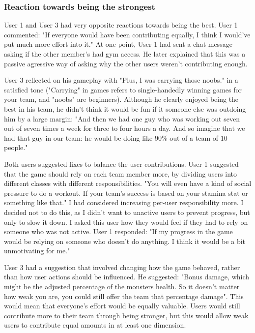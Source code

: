 \documentclass{l4proj}
\begin{document}
\subsubsection{Reaction towards being the strongest}

User 1 and User 3 had very opposite reactions towards being the best. User 1 commented: "If everyone would have been contributing equally, I think I would've put much more effort into it." At one point, User 1 had sent a chat message asking if the other member's had gym access. He later explained that this was a passive agressive way of asking why the other users weren't contributing enough. 

User 3 reflected on his gameplay with "Plus, I was carrying those noobs." in a satisfied tone ("Carrying" in games refers to single-handedly winning games for your team, and "noobs" are beginners). Although he clearly enjoyed being the best in his team, he didn't think it would be fun if it someone else was outdoing him by a large margin: "And then we had one guy who was working out seven out of seven times a week for three to four hours a day. And so imagine that we had that guy in our team: he would be doing like 90\% out of a team of 10 people." 

Both users suggested fixes to balance the user contributions. User 1 suggested that the game should rely on each team member more, by dividing users into different classes with different responsibilities. "You will even have a kind of social pressure to do a workout. If your team's success is based on your stamina stat or something like that." I had considered increasing per-user responsibility more. I decided not to do this, as I didn't want to unactive users to prevent progress, but only to slow it down. I asked this user how they would feel if they had to rely on someone who was not active. User 1 responded: "If my progress in the game would be relying on someone who doesn't do anything. I think it would be a bit unmotivating for me." 

User 3 had a suggestion that involved changing how the game behaved, rather than how user actions should be influenced. He suggested: "Bonus damage, which might be the adjusted percentage of the monsters health. So it doesn't matter how weak you are, you could still offer the team that percentage damage". This would mean that everyone's effort would be equally valuable. Users would still contribute more to their team through being stronger, but this would allow weak users to contribute equal amounts in at least one dimension. 
\end{document}
